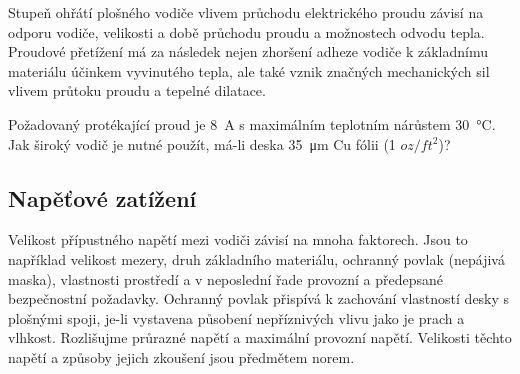     Stupeň ohřátí plošného vodiče vlivem průchodu elektrického proudu závisí na odporu vodiče,
    velikosti a době průchodu proudu a možnostech odvodu tepla. Proudové přetížení má za
    následek nejen zhoršení adheze vodiče k základnímu materiálu účinkem vyvinutého tepla, ale
    také vznik značných mechanických sil vlivem průtoku proudu a tepelné dilatace. 
    
    \begin{example}
      Požadovaný protékající proud je \SI{8}{\A} s maximálním teplotním nárůstem 
      \SI{30}{\degreeCelsius}. Jak široký vodič je nutné použít, má-li deska \SI{35}{\micro\m} Cu 
      fólii (\num{1} \(oz/ft^2\))? 
      
    \end{example}
    
  \subsection{Napěťové zatížení}
    Velikost přípustného napětí mezi vodiči závisí na mnoha faktorech. Jsou to například velikost
    mezery, druh základního materiálu, ochranný povlak (nepájivá maska), vlastnosti prostředí a
    v neposlední řade provozní a předepsané bezpečnostní požadavky. Ochranný povlak přispívá
    k zachování vlastností desky s plošnými spoji, je-li vystavena působení nepříznivých vlivu
    jako je prach a vlhkost. Rozlišujme průrazné napětí a maximální provozní napětí. Velikosti 
    těchto napětí a způsoby jejich zkoušení jsou předmětem norem. 


